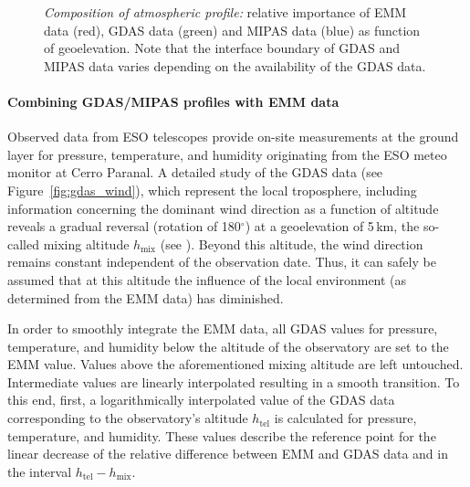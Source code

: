 \begin{figure}[ht]
  \begin{center}
    \caption{{\it Composition of atmospheric profile:} relative importance of
    EMM data (red), \ac{GDAS} data (green) and MIPAS data (blue) as function of
    geoelevation. Note that the interface boundary of \ac{GDAS} and MIPAS data
    varies depending on the availability of the \ac{GDAS} data.}
    \label{fig:profile_levels}
  \end{center}
\end{figure}

\paragraph*{Combining GDAS/MIPAS profiles with EMM data}
\label{sec:emm_data}
Observed data from ESO telescopes provide on-site measurements at the ground
layer for pressure, temperature, and humidity originating from the ESO meteo
monitor at Cerro Paranal. A detailed study of the \ac{GDAS} data (see
Figure~\ref{fig:gdas_wind}), which represent the local troposphere, including
information concerning the dominant wind direction as a function of altitude
reveals a gradual reversal (rotation of 180$^\circ$) at a geoelevation of
5\,km, the so-called mixing altitude $h_{\mathrm{mix}}$ (see \cite{SM01UM}).
Beyond this altitude, the wind direction remains constant independent of the
observation date. Thus, it can safely be assumed that at this altitude the
influence of the local environment (as determined from the \ac{EMM} data) has
diminished.

In order to smoothly integrate the \ac{EMM} data, all \ac{GDAS} values for
pressure, temperature, and humidity below the altitude of the observatory are
set to the \ac{EMM} value. Values above the aforementioned mixing altitude are
left untouched. Intermediate values are linearly interpolated resulting in a
smooth transition. To this end, first, a logarithmically interpolated value of
the \ac{GDAS} data corresponding to the observatory's altitude $h_{\mathrm{tel}}$
is calculated for pressure, temperature, and humidity. These values describe
the reference point for the linear decrease of the relative difference between
\ac{EMM} and \ac{GDAS} data and in the interval $h_{\mathrm{tel}}-h_{\mathrm{mix}}$.

